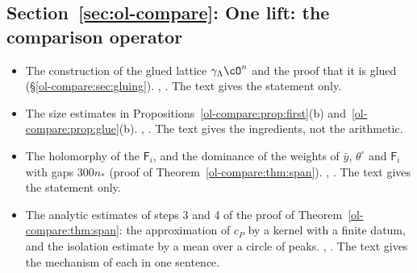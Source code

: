 \subsection*{Section~\ref{sec:ol-compare}: One lift: the comparison operator}
\begin{itemize}[leftmargin=2em,itemsep=1pt]
\item The construction of the glued lattice $\gamma_\Lambda\cO^n$ and the proof that it is glued
  (\S\ref{ol-compare:sec:gluing}). ,
  . The text gives the statement only.
\item The size estimates in Propositions~\ref{ol-compare:prop:first}(b)
  and~\ref{ol-compare:prop:glue}(b). ,
  . The text gives the ingredients, not the
  arithmetic.
\item The holomorphy of the $\mathsf F_i$, and the dominance of the weights of $\bar y$,
  $\theta^\circ$ and $\mathsf F_i$ with gaps $300n_*$ (proof of Theorem~\ref{ol-compare:thm:span}).
  , .
  The text gives the statement only.
\item The analytic estimates of steps 3 and 4 of the proof of Theorem~\ref{ol-compare:thm:span}:
  the approximation of $c_P$ by a kernel with a finite datum, and the isolation estimate by a mean
  over a circle of peaks. ,
  . The text gives the mechanism of each in one
  sentence.
\end{itemize}

